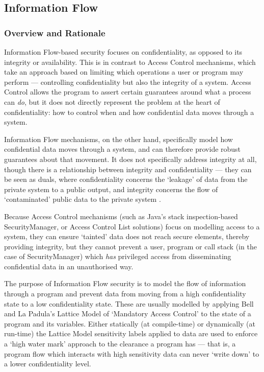 \subsection{Information Flow}

\subsubsection{Overview and Rationale}

Information Flow-based security focuses on confidentiality, as opposed to its integrity or availability. This is in contrast to Access Control mechanisms, which take an approach based on limiting which operations a user or program may perform --- controlling confidentiality but also the integrity of a system. Access Control allows the program to assert certain guarantees around what a process can \textit{do}, but it does not directly represent the problem at the heart of confidentiality: how to control when and how confidential data moves through a system.

Information Flow mechanisms, on the other hand, specifically model how confidential data moves through a system, and can therefore provide robust guarantees about that movement. It does not specifically address integrity at all, though there is a relationship between integrity and confidentiality --- they can be seen as duals, where confidentiality concerns the `leakage' of data from the private system to a public output, and integrity concerns the flow of `contaminated' public data to the private system \cite{biba1977integrity} \cite{clarkson2010confintegrity}.

Because Access Control mechanisms (such as Java's stack inspection-based SecurityManager, or Access Control List solutions) focus on modelling access to a system, they can ensure `tainted' data does not reach secure elements, thereby providing integrity, but they cannot prevent a user, program or call stack (in the case of SecurityManager) which \textit{has} privileged access from disseminating confidential data in an unauthorised way.

The purpose of Information Flow security is to model the flow of information through a program and prevent data from moving from a high confidentiality state to a low confidentiality state. These are usually modelled by applying Bell and La Padula's Lattice Model \cite{bell1976lattice} of `Mandatory Access Control' to the state of a program and its variables. Either statically (at compile-time) or dynamically (at run-time) the Lattice Model sensitivity labels applied to data are used to enforce a `high water mark' \cite{ausanka2001accesscontrol} approach to the clearance a program has --- that is, a program flow which interacts with high sensitivity data can never `write down' to a lower confidentiality level.

